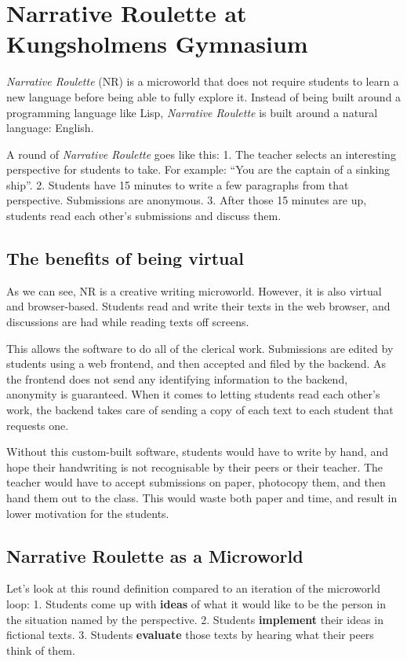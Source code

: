 \section{Narrative Roulette at Kungsholmens Gymnasium}

\emph{Narrative Roulette} (NR) is a microworld that does not require
students to learn a new language before being able to fully explore it.
Instead of being built around a programming language like Lisp,
\emph{Narrative Roulette} is built around a natural language: English.

A round of \emph{Narrative Roulette} goes like this: 1. The teacher
selects an interesting perspective for students to take. For example:
``You are the captain of a sinking ship''. 2. Students have 15 minutes
to write a few paragraphs from that perspective. Submissions are
anonymous. 3. After those 15 minutes are up, students read each other's
submissions and discuss them.

\subsection{The benefits of being virtual}

As we can see, NR is a creative writing microworld. However, it is also
virtual and browser-based. Students read and write their texts in the
web browser, and discussions are had while reading texts off screens.

This allows the software to do all of the clerical work. Submissions are
edited by students using a web frontend, and then accepted and filed by
the backend. As the frontend does not send any identifying information
to the backend, anonymity is guaranteed. When it comes to letting
students read each other's work, the backend takes care of sending a
copy of each text to each student that requests one.

Without this custom-built software, students would have to write by
hand, and hope their handwriting is not recognisable by their peers or
their teacher. The teacher would have to accept submissions on paper,
photocopy them, and then hand them out to the class. This would waste
both paper and time, and result in lower motivation for the students.

\subsection{Narrative Roulette as a Microworld}

Let's look at this round definition compared to an iteration of the
microworld loop: 1. Students come up with \textbf{ideas} of what it
would like to be the person in the situation named by the perspective.
2. Students \textbf{implement} their ideas in fictional texts. 3.
Students \textbf{evaluate} those texts by hearing what their peers think
of them.

